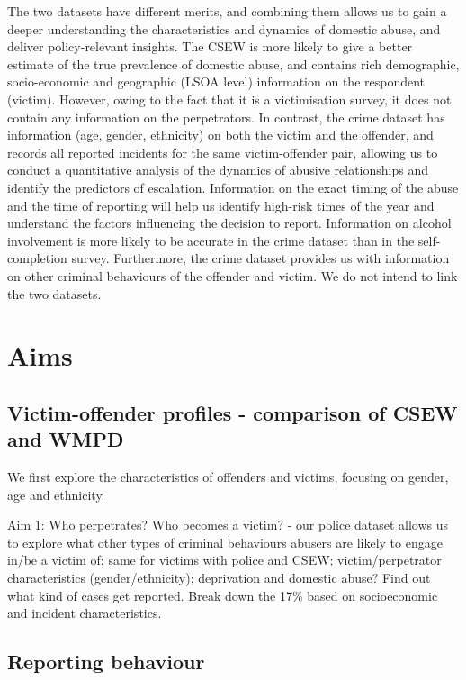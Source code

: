 \documentclass[12pt, letterpaper]{article}
\begin{document}
The two datasets have different merits, and combining them allows us to gain a deeper understanding the characteristics and dynamics of domestic abuse, and deliver policy-relevant insights. The CSEW is more likely to give a better estimate of the true prevalence of domestic abuse, and contains rich demographic, socio-economic and geographic (LSOA level) information on the respondent (victim). However, owing to the fact that it is a victimisation survey, it does not contain any information on the perpetrators. In contrast, the crime dataset has information (age, gender, ethnicity) on both the victim and the offender, and records all reported incidents for the same victim-offender pair, allowing us to conduct a quantitative analysis of the dynamics of abusive relationships and identify the predictors of escalation. Information on the exact timing of the abuse and the time of reporting will help us identify high-risk times of the year and understand the factors influencing the decision to report. Information on alcohol involvement is more likely to be accurate in the crime dataset than in the self-completion survey. Furthermore, the crime dataset provides us with information on other criminal behaviours of the offender and victim.  We do not intend to link the two datasets.



\section{Aims}

\subsection{Victim-offender profiles - comparison of CSEW and WMPD}

We first explore the characteristics of offenders and victims, focusing on gender, age and ethnicity. 


Aim 1: Who perpetrates? Who becomes a victim? - our police dataset allows us to explore what other types of criminal behaviours abusers are likely to engage in/be a victim of; same for victims with police and CSEW; victim/perpetrator characteristics (gender/ethnicity); deprivation and domestic abuse? Find out what kind of cases get reported. Break down the 17\% based on socioeconomic and incident characteristics.


\subsection{Reporting behaviour}
\end{document}
